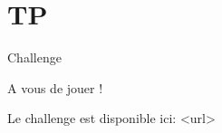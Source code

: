 \section{TP}

\begin{frame}{Challenge}

\begin{block}{A vous de jouer !}

Le challenge est disponible ici: <url>

\end{block}
\end{frame}

